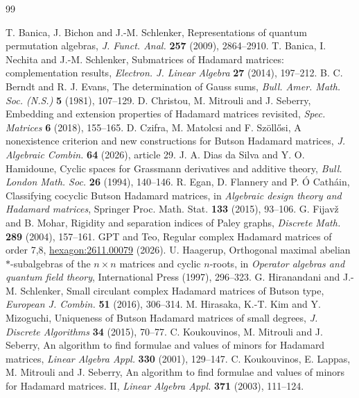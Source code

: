 \documentclass[11pt,a4paper]{article}
\numberwithin{equation}{section}
\begin{document}
\begingroup
\hypersetup{allcolors=black}
\small
\begin{thebibliography}{99}
\setlength{\itemsep}{0pt}
 T. Banica, J. Bichon and J.-M. Schlenker, Representations of quantum permutation algebras, \emph{J. Funct. Anal.} \textbf{257} (2009), 2864--2910.
 T. Banica, I. Nechita and J.-M. Schlenker, Submatrices of Hadamard matrices: complementation results, \emph{Electron. J. Linear Algebra} \textbf{27} (2014), 197--212.
 B. C. Berndt and R. J. Evans, The determination of Gauss sums, \emph{Bull. Amer. Math. Soc. (N.S.)} \textbf{5} (1981), 107--129.
 D. Christou, M. Mitrouli and J. Seberry, Embedding and extension properties of Hadamard matrices revisited, \emph{Spec. Matrices} \textbf{6} (2018), 155--165.
 D. Czifra, M. Matolcsi and F. Sz\"oll\H{o}si, A nonexistence criterion and new constructions for Butson Hadamard matrices, \emph{J. Algebraic Combin.} \textbf{64} (2026), article 29.
 J. A. Dias da Silva and Y. O. Hamidoune, Cyclic spaces for Grassmann derivatives and additive theory, \emph{Bull. London Math. Soc.} \textbf{26} (1994), 140--146.
 R. Egan, D. Flannery and P. \'O Cath\'ain, Classifying cocyclic Butson Hadamard matrices, in \emph{Algebraic design theory and Hadamard matrices}, Springer Proc. Math. Stat. \textbf{133} (2015), 93--106.
 G. Fijav\v{z} and B. Mohar, Rigidity and separation indices of Paley graphs, \emph{Discrete Math.} \textbf{289} (2004), 157--161.
 GPT and Teo, Regular complex Hadamard matrices of order 7,8, \href{https://hexagonmath.org/2611.00079v1}{hexagon:2611.00079} (2026).
 U. Haagerup, Orthogonal maximal abelian $*$-subalgebras of the $n\times n$ matrices and cyclic $n$-roots, in \emph{Operator algebras and quantum field theory}, International Press (1997), 296--323.
 G. Hiranandani and J.-M. Schlenker, Small circulant complex Hadamard matrices of Butson type, \emph{European J. Combin.} \textbf{51} (2016), 306--314.
 M. Hirasaka, K.-T. Kim and Y. Mizoguchi, Uniqueness of Butson Hadamard matrices of small degrees, \emph{J. Discrete Algorithms} \textbf{34} (2015), 70--77.
 C. Koukouvinos, M. Mitrouli and J. Seberry, An algorithm to find formulae and values of minors for Hadamard matrices, \emph{Linear Algebra Appl.} \textbf{330} (2001), 129--147.
 C. Koukouvinos, E. Lappas, M. Mitrouli and J. Seberry, An algorithm to find formulae and values of minors for Hadamard matrices. II, \emph{Linear Algebra Appl.} \textbf{371} (2003), 111--124.

\end{thebibliography}
\end{document}
